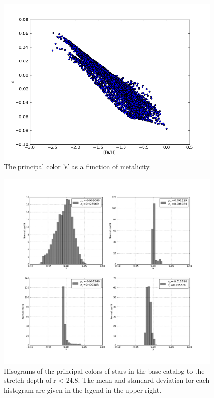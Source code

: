 \documentclass[]{article}
\begin{document}
\begin{figure}
\centering
\includegraphics[width=5in]{validation_figures/s_met.png}
\caption{The principal color 's' as a function of metalicity.\label{fig:sfeh}}
\end{figure}

\begin{figure}
\centering
\includegraphics[width=5in]{validation_figures/principal_colors_hist.png}
\caption{Hisograms of the principal colors of stars in the base catalog to the stretch depth of r < 24.8. The mean and standard deviation for each 
histogram are given in the legend in the upper right.\label{fig:principalcolorshist}}
\end{figure}
\end{document}
